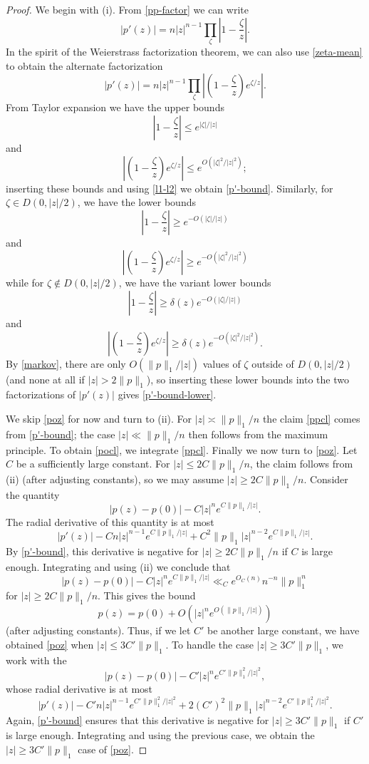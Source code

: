 \documentclass[12pt]{amsart}
\begin{document}
\begin{proof}  We begin with (i).  From \eqref{pp-factor} we can write
$$ |p'(z)| = n |z|^{n-1} \prod_\zeta \left| 1 - \frac{\zeta}{z} \right|.$$
In the spirit of the Weierstrass factorization theorem, we can also use \eqref{zeta-mean} to obtain the alternate factorization
$$ |p'(z)| = n |z|^{n-1} \prod_\zeta \left| \left( 1 - \frac{\zeta}{z} \right) e^{\zeta/z}  \right|.$$
From Taylor expansion we have the upper bounds
$$\left| 1 - \frac{\zeta}{z} \right| \leq e^{|\zeta|/|z|}$$
and
$$\left| \left( 1 - \frac{\zeta}{z} \right) e^{\zeta/z} \right| \leq e^{O(|\zeta|^2/|z|^2)};$$
inserting these bounds and using \eqref{l1-l2} we obtain \eqref{p'-bound}.  Similarly, for $\zeta \in D(0,|z|/2)$, we have the lower bounds
$$\left| 1 - \frac{\zeta}{z} \right| \geq e^{-O(|\zeta|/|z|)}$$
and
$$\left| \left( 1 - \frac{\zeta}{z} \right) e^{\zeta/z} \right| \geq e^{-O(|\zeta|^2/|z|^2)}$$
while for $\zeta \notin D(0,|z|/2)$, we have the variant lower bounds
$$\left| 1 - \frac{\zeta}{z} \right| \geq \delta(z) e^{-O(|\zeta|/|z|)}$$
and
$$\left| \left( 1 - \frac{\zeta}{z} \right) e^{\zeta/z} \right| \geq \delta(z) e^{-O(|\zeta|^2/|z|^2)}.$$
By \eqref{markov}, there are only $O(\|p\|_1/|z|)$ values of $\zeta$ outside of $D(0,|z|/2)$ (and none at all if $|z| > 2 \|p\|_1$), so inserting these lower bounds into the two factorizations of $|p'(z)|$ gives \eqref{p'-bound-lower}.

We skip \eqref{poz} for now and turn to (ii).  For $|z| \asymp \|p\|_1/n$ the claim \eqref{ppcl} comes from \eqref{p'-bound}; the case $|z| \ll \|p\|_1/n$ then follows from the maximum principle.  To obtain \eqref{pocl}, we integrate \eqref{ppcl}.
Finally we now turn to \eqref{poz}.  Let $C$ be a sufficiently large constant.  For $|z| \leq 2C\|p\|_1/n$, the claim follows from (ii) (after adjusting constants), so we may assume $|z| \geq 2C\|p\|_1/n$. Consider the quantity
$$ |p(z)-p(0)| - C |z|^n e^{C\|p\|_1/|z|}.$$
The radial derivative of this quantity is at most
$$ |p'(z)| - C n |z|^{n-1} e^{C\|p\|_1/|z|} + C^2 \|p\|_1|z|^{n-2} e^{C\|p\|_1/|z|}.$$
By \eqref{p'-bound}, this derivative is negative for $|z| \geq 2C\|p\|_1/n$ if $C$ is large enough.  Integrating and using (ii) we conclude that
$$ |p(z)-p(0)| - C |z|^n e^{C\|p\|_1/|z|} \ll_C e^{O_C(n)} n^{-n} \|p\|_1^n$$
for $|z| \geq 2C\|p\|_1/n$.  This gives the bound
$$ p(z) = p(0) + O(|z|^n e^{O(\|p\|_1/|z|)})$$
(after adjusting constants).  Thus, if we let $C'$ be another large constant, we have obtained \eqref{poz} when $|z| \leq 3C' \|p\|_1$.  To handle the case $|z| \geq 3C'\|p\|_1$, we work with the
$$ |p(z)-p(0)| - C' |z|^n e^{C'\|p\|_1^2/|z|^2},$$
whose radial derivative is at most
$$ |p'(z)| - C' n |z|^{n-1} e^{C'\|p\|_1^2/|z|^2} + 2(C')^2 \|p\|_1|z|^{n-2} e^{C'\|p\|_1^2/|z|^2}.$$
Again, \eqref{p'-bound} ensures that this derivative is negative for $|z| \geq 3C'\|p\|_1$ if $C'$ is large enough.  Integrating and using the previous case, we obtain the $|z| \geq 3C' \|p\|_1$ case of \eqref{poz}.
\end{proof}
\end{document}
